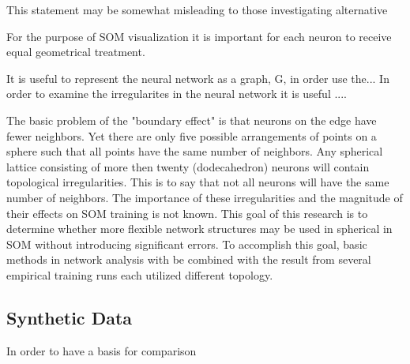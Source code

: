\documentclass[11pt]{article}
\begin{document}
This statement may be somewhat misleading to those investigating alternative 


For the purpose of SOM visualization it is important for each neuron to receive equal geometrical treatment.


It is useful to represent the neural network as a graph, G, in order use the...
In order to examine the irregularites in the neural network it is useful ....



The basic problem of the "boundary effect" is that neurons on the edge have
fewer neighbors. Yet there are only five possible arrangements of points on a
sphere such that all points have the same number of neighbors.  Any spherical
lattice consisting of more then twenty (dodecahedron) neurons will contain
topological irregularities.  This is to say that not all neurons will have the
same number of neighbors.  The importance of these irregularities and the 
magnitude of their effects on SOM training is not known.  This goal of this research
is to determine whether more flexible network structures may be used in spherical 
in SOM without introducing significant errors. To accomplish this goal, basic methods 
in network analysis with be combined with the result from several empirical training
runs each utilized different topology.  

\subsection{Synthetic Data}
In order to have a basis for comparison 




\end{document}
